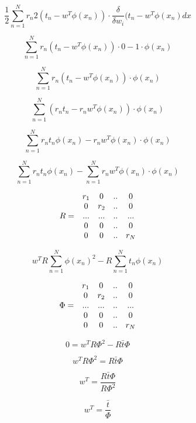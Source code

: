 \documentclass{article}
\begin{document}
\begin{equation*}
    \frac{1}{2}\sum_{n=1}^{N} r_n 2(t_n - w^T\phi(x_n)) \cdot \frac{\delta}{\delta w_i} (t_n - w^T\phi(x_n) dx
\end{equation*}

\begin{equation*}
    \sum_{n=1}^{N} r_n (t_n - w^T\phi(x_n)) \cdot 0 - 1 \cdot \phi(x_n)
\end{equation*}

\begin{equation*}
    \sum_{n=1}^{N} r_n (t_n - w^T\phi(x_n)) \cdot \phi(x_n)
\end{equation*}

\begin{equation*}
    \sum_{n=1}^{N} (r_n t_n - r_n w^T\phi(x_n)) \cdot \phi(x_n)
\end{equation*}

\begin{equation*}
    \sum_{n=1}^{N} r_n t_n \phi(x_n) - r_n w^T\phi(x_n) \cdot \phi(x_n)
\end{equation*}

\begin{equation*}
    \sum_{n=1}^{N} r_n t_n \phi(x_n) - \sum_{n=1}^{N} r_n w^T\phi(x_n) \cdot \phi(x_n)
\end{equation*}

\begin{equation*}
    \begin{array}{r c c c c}
    &   r_1 & 0   & .. & 0   \\
    &   0   & r_2 & .. & 0   \\
  R =   &  ...  & ... & .. & ...   \\
    &   0   & 0   & .. & 0   \\
    &   0   & 0   & .. & r_N 
    \end{array}
\end{equation*}

\begin{equation*}
    w^T R \sum_{n=1}^{N} \phi(x_n)^2 - R \sum_{n=1}^{N} t_n \phi(x_n) 
\end{equation*}

\begin{equation*}
    \begin{array}{r c c c c}
           &   r_1 & 0   & .. & 0   \\
           &   0   & r_2 & .. & 0   \\
  \Phi =   &  ...  & ... & .. & ...   \\
           &   0   & 0   & .. & 0   \\
           &   0   & 0   & .. & r_N 
    \end{array}
\end{equation*}

\begin{equation*}
    0 = w^T R \Phi^2 - R \bar{t} \Phi 
\end{equation*}

\begin{equation*}
    w^T R \Phi^2 = R \bar{t} \Phi 
\end{equation*}

\begin{equation*}
    w^T = \frac{R \bar{t} \Phi}{R \Phi^2}
\end{equation*}

\begin{equation*}
    w^T = \frac{\bar{t}}{\Phi}
\end{equation*}
\end{document}
